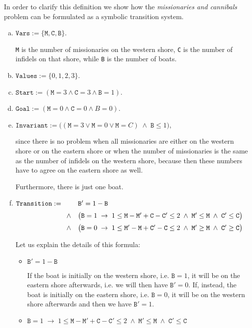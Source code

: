 In order to clarify this definition we show how the \emph{missionaries and cannibals} problem can be formulated as
a symbolic transition system.
\begin{enumerate}[(a)]
\item $\texttt{Vars} := \{ \mathtt{M}, \mathtt{C}, \mathtt{B} \}$.

      \texttt{M} is the number of missionaries on the western shore, \texttt{C} is the number of infidels on
      that shore, while \texttt{B} is the number of boats.
\item $\mathtt{Values} := \{ 0, 1, 2, 3 \}$.
\item $\texttt{Start} := (\mathtt{M} = 3 \wedge \mathtt{C} = 3 \wedge \mathtt{B} = 1)$.
\item $\texttt{Goal}  := (\mathtt{M} = 0 \wedge \mathtt{C} = 0 \wedge B = 0)$.
\item $\texttt{Invariant} := \bigl((\mathtt{M} = 3 \vee \mathtt{M} = 0 \vee \mathtt{M} = C) \;\wedge\; \mathtt{B} \leq 1\bigr)$,

      since there is no problem when all missionaries are either on the western shore or on the eastern shore
      or when the number of missionaries is the same as the number of infidels on the western shore, because
      then these numbers have to agree on the eastern shore as well.

      Furthermore, there is just one boat.
\item $\texttt{Transition} :=
      \begin{array}[t]{cl}
         &  \mathtt{B}' = 1 - \mathtt{B}   \\[0.2cm]
        \wedge & \bigl(\mathtt{B} = 1 \;\rightarrow\; 1 \leq \mathtt{M} - \mathtt{M}'  + \mathtt{C} - \mathtt{C}' \leq 2 \;\wedge\;
        \mathtt{M}' \leq \mathtt{M} \;\wedge\; \mathtt{C}' \leq \mathtt{C}\bigr) \\[0.2cm]
        \wedge & \bigl(\mathtt{B} = 0 \;\rightarrow\; 1 \leq \mathtt{M}' - \mathtt{M}  + \mathtt{C}' - \mathtt{C} \leq 2 \;\wedge\;
                \mathtt{M}' \geq \mathtt{M} \;\wedge\; \mathtt{C}' \geq \mathtt{C}\bigr) 
      \end{array}
      $

      Let us explain the details of this formula:
      \begin{itemize}
      \item $\mathtt{B}' = 1 - \mathtt{B}$

            If the boat is initially on the western shore, i.e. $\texttt{B} = 1$, it will be on the eastern
            shore afterwards, i.e. we will then have $\texttt{B}' = 0$.  If, instead, the boat is initially on
            the eastern shore, i.e. $\texttt{B} = 0$, it will be on the western
            shore afterwards and then we have $\texttt{B}' = 1$.
      \item $\mathtt{B} = 1 \;\rightarrow\; 1 \leq \mathtt{M} - \mathtt{M}'  + \mathtt{C} - \mathtt{C}' \leq 2 \;\wedge\;
             \mathtt{M}' \leq \mathtt{M} \;\wedge\; \mathtt{C}' \leq \mathtt{C}$



\end{itemize}
\end{enumerate}
